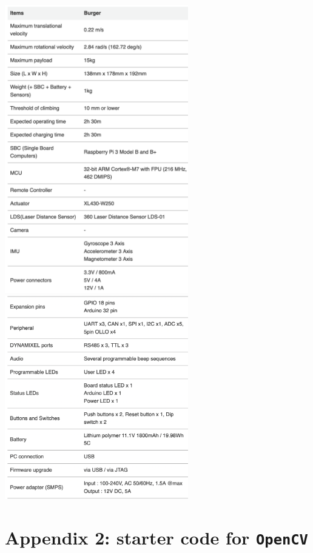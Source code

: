\documentclass[10pt,a4paper,printanswers]{upmc}
\begin{document}
\begin{center}
  \includegraphics[width=8cm]{figures/datasheet1.png}\\
  \includegraphics[width=8cm]{figures/datasheet2.png}
\end{center}


\newpage
\section{Appendix 2: starter code for \texttt{OpenCV}}

\end{document}
